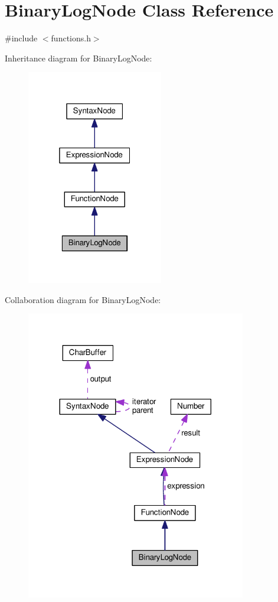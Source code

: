 \hypertarget{classBinaryLogNode}{}\section{Binary\+Log\+Node Class Reference}
\label{classBinaryLogNode}


{\ttfamily \#include $<$functions.\+h$>$}



Inheritance diagram for Binary\+Log\+Node\+:\nopagebreak
\begin{figure}[H]
\begin{center}
\leavevmode
\includegraphics[width=169pt]{classBinaryLogNode__inherit__graph}
\end{center}
\end{figure}


Collaboration diagram for Binary\+Log\+Node\+:\nopagebreak
\begin{figure}[H]
\begin{center}
\leavevmode
\includegraphics[width=272pt]{classBinaryLogNode__coll__graph}
\end{center}
\end{figure}
